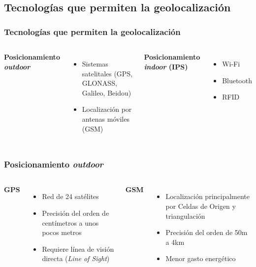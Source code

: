 \documentclass[mathserif]{beamer}
\begin{document}

\subsection{Tecnologías que permiten la geolocalización}

\begin{frame}
\frametitle{Tecnologías que permiten la geolocalización}

\begin{columns}[t]

\textbf{Posicionamiento \textit{outdoor}}

\begin{itemize}
\item Sistemas satelitales (GPS, GLONASS, Galileo, Beidou)
\item Localización por antenas móviles (GSM)
\end{itemize}


\textbf{Posicionamiento \textit{indoor} (IPS)}

\begin{itemize}
\item Wi-Fi
\item Bluetooth
\item RFID
\end{itemize}

\end{columns}

\end{frame}


\begin{frame}
\frametitle{Posicionamiento \textit{outdoor}}

\begin{columns}[t]


\textbf{GPS}

\begin{itemize}
\item Red de 24 satélites 
\item Precisión del orden de centímetros a unos pocos metros
\item Requiere línea de visión directa (\textit{Line of Sight})
\end{itemize}


\textbf{GSM}

\begin{itemize}
\item Localización principalmente por Celdas de Origen y triangulación
\item Precisión del orden de 50m a 4km
\item Menor gasto energético
\end{itemize}



\end{columns}
\end{frame}
\end{document}
